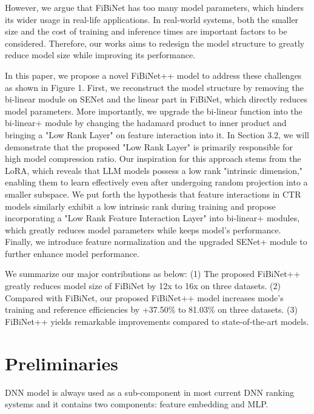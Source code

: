 \documentclass[sigconf]{acmart}
\begin{document}
However, we argue that FiBiNet has too many model parameters, which hinders its wider usage in real-life applications.  In real-world systems, both the smaller size and the cost of training and inference times are important factors to be considered. Therefore, our works aims to redesign the model structure to greatly reduce model size while improving its performance. 

In this paper, we propose a novel FiBiNet++ model to address these challenges as shown in Figure 1. First, we reconstruct the model structure by removing the bi-linear module on SENet and the linear part in FiBiNet, which directly reduces model parameters. More importantly, we upgrade the bi-linear function into the bi-linear+ module by changing the hadamard product to inner product and bringing a "Low Rank Layer" on feature interaction into it. In Section 3.2, we will demonstrate that the proposed "Low Rank Layer" is primarily responsible for high model compression ratio. Our inspiration for this approach stems from the LoRA\cite{lora}, which reveals that LLM models possess a low rank "intrinsic dimension," enabling them to learn effectively even after undergoing random projection into a smaller subspace. We put forth the hypothesis that feature interactions in CTR models similarly exhibit a low intrinsic rank during training and propose incorporating a "Low Rank Feature Interaction Layer" into bi-linear+ modules, which greatly reduces model parameters while keeps model's performance. Finally, we introduce feature normalization and the upgraded SENet+ module to further enhance model performance.



We summarize our major contributions as below:
(1) The proposed FiBiNet++ greatly reduces model size of FiBiNet by 12x to 16x on three datasets. 
(2) Compared with FiBiNet, our proposed FiBiNet++ model increases mode's training and reference efficiencies by +37.50\% to 81.03\% on three datasets.
(3) FiBiNet++ yields remarkable improvements compared to state-of-the-art models.

\section{Preliminaries}
DNN model is always used as a sub-component in most current DNN ranking systems\cite{xiao2017attentional,guo2017deepfm,lian2018xdeepfm,wang2017deep,HuangZZ19,covington2016deep,qu2016} and it contains two components: feature embedding and MLP.
\end{document}
